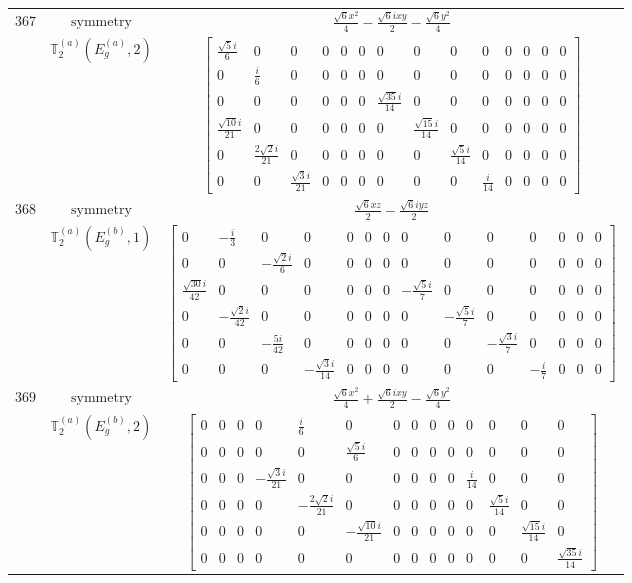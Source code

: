 \documentclass[fleqn,8pt,landscape]{jsarticle}
\begin{document}
\begin{longtable}{ccc}
$ 367 $ & $ \text{symmetry} $ & $ \frac{\sqrt{6} x^{2}}{4} - \frac{\sqrt{6} i x y}{2} - \frac{\sqrt{6} y^{2}}{4} $ \\
$  $ & $ \mathbb{T}_{2}^{(a)}(E_{g}^{(a)},2) $ & $ \begin{bmatrix} \frac{\sqrt{5} i}{6} & 0 & 0 & 0 & 0 & 0 & 0 & 0 & 0 & 0 & 0 & 0 & 0 & 0 \\ 0 & \frac{i}{6} & 0 & 0 & 0 & 0 & 0 & 0 & 0 & 0 & 0 & 0 & 0 & 0 \\ 0 & 0 & 0 & 0 & 0 & 0 & \frac{\sqrt{35} i}{14} & 0 & 0 & 0 & 0 & 0 & 0 & 0 \\ \frac{\sqrt{10} i}{21} & 0 & 0 & 0 & 0 & 0 & 0 & \frac{\sqrt{15} i}{14} & 0 & 0 & 0 & 0 & 0 & 0 \\ 0 & \frac{2 \sqrt{2} i}{21} & 0 & 0 & 0 & 0 & 0 & 0 & \frac{\sqrt{5} i}{14} & 0 & 0 & 0 & 0 & 0 \\ 0 & 0 & \frac{\sqrt{3} i}{21} & 0 & 0 & 0 & 0 & 0 & 0 & \frac{i}{14} & 0 & 0 & 0 & 0 \end{bmatrix} $ \\ \hline
$ 368 $ & $ \text{symmetry} $ & $ \frac{\sqrt{6} x z}{2} - \frac{\sqrt{6} i y z}{2} $ \\
$  $ & $ \mathbb{T}_{2}^{(a)}(E_{g}^{(b)},1) $ & $ \begin{bmatrix} 0 & - \frac{i}{3} & 0 & 0 & 0 & 0 & 0 & 0 & 0 & 0 & 0 & 0 & 0 & 0 \\ 0 & 0 & - \frac{\sqrt{2} i}{6} & 0 & 0 & 0 & 0 & 0 & 0 & 0 & 0 & 0 & 0 & 0 \\ \frac{\sqrt{30} i}{42} & 0 & 0 & 0 & 0 & 0 & 0 & - \frac{\sqrt{5} i}{7} & 0 & 0 & 0 & 0 & 0 & 0 \\ 0 & - \frac{\sqrt{2} i}{42} & 0 & 0 & 0 & 0 & 0 & 0 & - \frac{\sqrt{5} i}{7} & 0 & 0 & 0 & 0 & 0 \\ 0 & 0 & - \frac{5 i}{42} & 0 & 0 & 0 & 0 & 0 & 0 & - \frac{\sqrt{3} i}{7} & 0 & 0 & 0 & 0 \\ 0 & 0 & 0 & - \frac{\sqrt{3} i}{14} & 0 & 0 & 0 & 0 & 0 & 0 & - \frac{i}{7} & 0 & 0 & 0 \end{bmatrix} $ \\ \hline
$ 369 $ & $ \text{symmetry} $ & $ \frac{\sqrt{6} x^{2}}{4} + \frac{\sqrt{6} i x y}{2} - \frac{\sqrt{6} y^{2}}{4} $ \\
$  $ & $ \mathbb{T}_{2}^{(a)}(E_{g}^{(b)},2) $ & $ \begin{bmatrix} 0 & 0 & 0 & 0 & \frac{i}{6} & 0 & 0 & 0 & 0 & 0 & 0 & 0 & 0 & 0 \\ 0 & 0 & 0 & 0 & 0 & \frac{\sqrt{5} i}{6} & 0 & 0 & 0 & 0 & 0 & 0 & 0 & 0 \\ 0 & 0 & 0 & - \frac{\sqrt{3} i}{21} & 0 & 0 & 0 & 0 & 0 & 0 & \frac{i}{14} & 0 & 0 & 0 \\ 0 & 0 & 0 & 0 & - \frac{2 \sqrt{2} i}{21} & 0 & 0 & 0 & 0 & 0 & 0 & \frac{\sqrt{5} i}{14} & 0 & 0 \\ 0 & 0 & 0 & 0 & 0 & - \frac{\sqrt{10} i}{21} & 0 & 0 & 0 & 0 & 0 & 0 & \frac{\sqrt{15} i}{14} & 0 \\ 0 & 0 & 0 & 0 & 0 & 0 & 0 & 0 & 0 & 0 & 0 & 0 & 0 & \frac{\sqrt{35} i}{14} \end{bmatrix} $ \\ \hline

\end{longtable}
\end{document}
